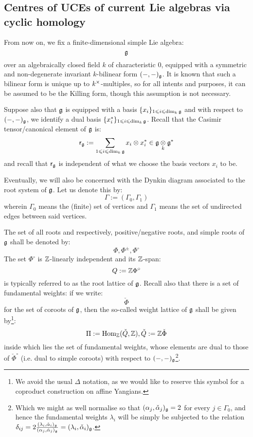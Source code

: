     \subsection{Centres of UCEs of current Lie algebras via cyclic homology}
        \begin{convention} \label{conv: a_fixed_finite_dimensional_simple_lie_algebra}
            From now on, we fix a finite-dimensional simple Lie algebra:
                $$\mathfrak{g}$$
            over an algebraically closed field $k$ of characteristic $0$, equipped with a symmetric and non-degenerate invariant $k$-bilinear form $(-, -)_{\mathfrak{g}}$. It is known that such a bilinear form is unique up to $k^{\x}$-multiples, so for all intents and purposes, it can be assumed to be the Killing form, though this assumption is not necessary. 
    
            Suppose also that $\mathfrak{g}$ is equipped with a basis $\{x_i\}_{1 \leqslant i \leqslant \dim_k \mathfrak{g}}$ and with respect to $(-, -)_{\mathfrak{g}}$, we identify a dual basis $\{x_i^*\}_{1 \leqslant i \leqslant \dim_k \mathfrak{g}}$. Recall that the Casimir tensor/canonical element of $\mathfrak{g}$ is:
                $$\sfr_{\g} := \sum_{1 \leq i \leq \dim_k \g} x_i \tensor x_i^* \in \g \tensor_k \g^*$$
            and recall that $\mathsf{r}_{\mathfrak{g}}$ is independent of what we choose the basis vectors $x_i$ to be.
    
            Eventually, we will also be concerned with the Dynkin diagram associated to the root system of $\mathfrak{g}$. Let us denote this by:
                $$\Gamma := (\Gamma_0, \Gamma_1)$$
            wherein $\Gamma_0$ means the (finite) set of vertices and $\Gamma_1$ means the set of undirected edges between said vertices. 
    
            The set of all roots and respectively, positive/negative roots, and simple roots of $\mathfrak{g}$ shall be denoted by:
                $$\Phi, \Phi^{\pm}, \Phi^{\circ}$$
            The set $\Phi^{\circ}$ is $\mathbb{Z}$-linearly independent and its $\mathbb{Z}$-span:
                $$Q := \mathbb{Z} \Phi^{\circ}$$
            is typically referred to as the root lattice of $\mathfrak{g}$. Recall also that there is a set of fundamental weights: if we write:
                $$\check{\Phi}$$
            for the set of coroots of $\mathfrak{g}$, then the so-called weight lattice of $\mathfrak{g}$ shall be given by\footnote{We avoid the usual $\Delta$ notation, as we would like to reserve this symbol for a coproduct construction on affine Yangians.}:
                $$\Pi := \mathrm{Hom}_{\mathbb{Z}}(\check{Q}, \mathbb{Z}), \check{Q} := \mathbb{Z}\check{\Phi}$$
            inside which lies the set of fundamental weights, whose elements are dual to those of $\check{\Phi}^{\circ}$ (i.e. dual to simple coroots) with respect to $(-, -)_{\mathfrak{g}}$\footnote{Which we might as well normalise so that $(\alpha_j, \check{\alpha}_j)_{\mathfrak{g}} = 2$ for every $j \in \Gamma_0$, and hence the fundamental weights $\lambda_i$ will be simply be subjected to the relation $\delta_{ij} = 2 \frac{(\lambda_i, \check{\alpha}_i)_{\mathfrak{g}}}{(\alpha_j, \check{\alpha}_j)_{\mathfrak{g}}} = (\lambda_i, \check{\alpha}_i)_{\mathfrak{g}}$.}.
        \end{convention}

